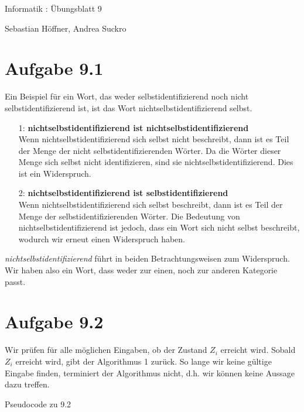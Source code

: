 \documentclass{article}
\begin{document}
\begin{center}
  \Large{Informatik \revD: Übungsblatt 9}

  \large{Sebastian Höffner, Andrea Suckro}
\end{center}

\section*{Aufgabe 9.1}
Ein Beispiel für ein Wort, das weder selbstidentifizierend noch nicht selbstidentifizierend ist, ist das Wort nichtselbstidentifizierend selbst.
\begin{itemize}
  \item[1:] \textbf{nichtselbstidentifizierend ist nichtselbstidentifizierend} \\
    Wenn nichtselbstidentifizierend sich selbst nicht beschreibt, dann ist es Teil der Menge der nicht selbstidentifizierenden Wörter. Da die Wörter dieser Menge sich selbst nicht identifizieren, sind sie nichtselbstidentifizierend. Dies ist ein Widerspruch.
  \item[2:] \textbf{nichtselbstidentifizierend ist selbstidentifizierend} \\
    Wenn nichtselbstidentifizierend sich selbst beschreibt, dann ist es Teil der Menge der selbstidentifizierenden Wörter. Die Bedeutung von nichtselbstidentifizierend ist jedoch, dass ein Wort sich nicht selbst beschreibt, wodurch wir erneut einen Widerspruch haben.
\end{itemize}

\bigskip
\textit{nichtselbstidentifizierend} führt in beiden Betrachtungsweisen zum Widerspruch. Wir haben also ein Wort, dass weder zur einen, noch zur anderen Kategorie passt.

\section*{Aufgabe 9.2}
Wir prüfen für alle möglichen Eingaben, ob der Zustand $Z_i$ erreicht wird. Sobald $Z_i$ erreicht wird, gibt der Algorithmus 1 zurück. So lange wir keine gültige Eingabe finden, terminiert der Algorithmus nicht, d.h. wir können keine Aussage dazu treffen.

\begin{algorithm}[ht]
  \caption{Pseudocode zu 9.2}
\end{algorithm}
\end{document}
